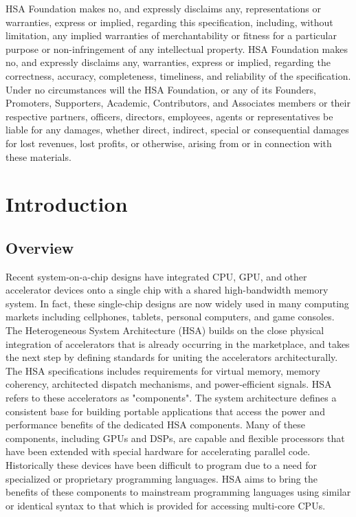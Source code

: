 \documentclass[final]{book}
\begin{document}
HSA Foundation makes no, and expressly disclaims any, representations or
warranties, express or implied, regarding this specification, including, without
limitation, any implied warranties of merchantability or fitness for a
particular purpose or non-infringement of any intellectual property. HSA
Foundation makes no, and expressly disclaims any, warranties, express or
implied, regarding the correctness, accuracy, completeness, timeliness, and
reliability of the specification. Under no circumstances will the HSA
Foundation, or any of its Founders, Promoters, Supporters, Academic,
Contributors, and Associates members or their respective partners, officers,
directors, employees, agents or representatives be liable for any damages,
whether direct, indirect, special or consequential damages for lost revenues,
lost profits, or otherwise, arising from or in connection with these materials.

\clearpage {}
\tableofcontents
\clearpage

\setcounter{page}{1}

\chapter{Introduction} \label{index}\hypertarget{index}{}
\hypertarget{overview}{}\section{Overview}\label{overview}

Recent system-on-a-chip designs have integrated CPU, GPU, and other accelerator
devices onto a single chip with a shared high-bandwidth memory system. In fact,
these single-chip designs are now widely used in many computing markets
including cellphones, tablets, personal computers, and game consoles. The
Heterogeneous System Architecture (HSA) builds on the close physical integration
of accelerators that is already occurring in the marketplace, and takes the next
step by defining standards for uniting the accelerators architecturally. The
HSA specifications includes requirements for virtual memory, memory coherency,
architected dispatch mechanisms, and power-efficient signals. HSA refers to
these accelerators as "components". The system architecture defines a
consistent base for building portable applications that access the power and
performance benefits of the dedicated HSA components. Many of these components,
including GPUs and DSPs, are capable and flexible processors that have been
extended with special hardware for accelerating parallel code. Historically
these devices have been difficult to program due to a need for specialized or
proprietary programming languages. HSA aims to bring the benefits of these
components to mainstream programming languages using similar or identical syntax
to that which is provided for accessing multi-core CPUs.
\end{document}
